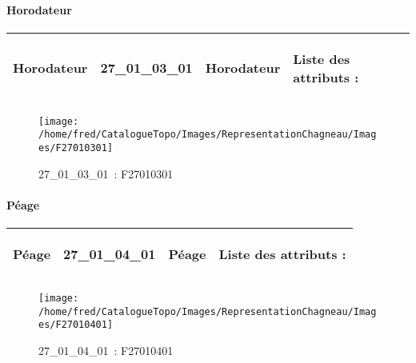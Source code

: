 \documentclass[12pt,titlepage,oneside]{book}
\begin{document}
\paragraph{Horodateur}
\noindent
\vspace{\baselineskip}

\renewcommand{\arraystretch}{1.2}
\begin{supertabular}{|p{10cm}|c|p{13cm}|p{12cm}|}
 Horodateur & 27\_01\_03\_01 & Horodateur & Liste des attributs :
\begin{enumerate}
\end{enumerate}
\\
\hline
\end{supertabular}
\begin{figure}[h!]
  \hfill         %
  \begin{minipage}[t]{3cm}
    \begin{center}
      \texttt{[image: /home/fred/CatalogueTopo/Images/RepresentationChagneau/Images/F27010301]}
      \caption[~27\_01\_03\_01]{\small{27\_01\_03\_01~:} \tiny{F27010301}}\label{F27010301}
    \end{center}
  \end{minipage}
\end{figure}


\paragraph{Péage}
\noindent
\vspace{\baselineskip}

\renewcommand{\arraystretch}{1.2}
\begin{supertabular}{|p{10cm}|c|p{13cm}|p{12cm}|}
 Péage & 27\_01\_04\_01 & Péage & Liste des attributs :
\begin{enumerate}
\end{enumerate}
\\
\hline
\end{supertabular}
\begin{figure}[h!]
  \hfill         %
  \begin{minipage}[t]{3cm}
    \begin{center}
      \texttt{[image: /home/fred/CatalogueTopo/Images/RepresentationChagneau/Images/F27010401]}
      \caption[~27\_01\_04\_01]{\small{27\_01\_04\_01~:} \tiny{F27010401}}\label{F27010401}
    \end{center}
  \end{minipage}
\end{figure}
\end{document}
